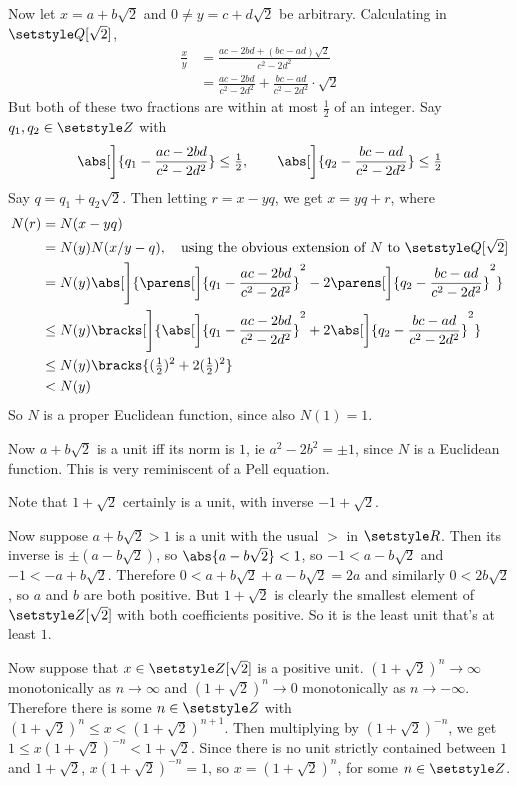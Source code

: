 \documentclass[fleqn,a4paper,11pt]{article}
\begin{document}
Now let \(x = a + b\sqrt 2\) and \(0 \ne y = c + d \sqrt 2\) be arbitrary.
Calculating in \(\Q[\sqrt 2]\),
\begin{align*}
 \frac xy
  &= \frac{ac - 2bd + (bc - ad)\sqrt 2}{c^2 - 2d^2} \\
  &= \frac{ac - 2bd}{c^2 - 2d^2} + \frac{bc - ad}{c^2 - 2d^2} \cdot \sqrt 2
\end{align*}
But both of these two fractions are within at most \(\tfrac 12\) of an integer.
Say \(q_1, q_2 \in \Z\) with
\begin{equation*}
 \abs[\bigg]{q_1 - \frac{ac - 2bd}{c^2 - 2d^2}} \le \tfrac 12, \qquad
 \abs[\bigg]{q_2 - \frac{bc - ad}{c^2 - 2d^2}} \le \tfrac 12
\end{equation*}
Say \(q = q_1 + q_2 \sqrt 2\). Then letting \(r = x - yq\), we get
\(x = yq + r\), where
\begin{align*}
 N(r)
  &= N(x - yq) \\
  &= N(y)N(x/y - q),
    \quad \text{using the obvious extension of \(N\) to \(\Q[\sqrt 2]\)} \\
  &= N(y) \abs[\Bigg]{\parens[\bigg]{q_1 - \frac{ac - 2bd}{c^2 - 2d^2}}^2
            - 2\parens[\bigg]{q_2 - \frac{bc - ad}{c^2 - 2d^2}}^2} \\
  &\le N(y) \bracks[\Bigg]{\abs[\bigg]{q_1 - \frac{ac - 2bd}{c^2 - 2d^2}}^2
            + 2\abs[\bigg]{q_2 - \frac{bc - ad}{c^2 - 2d^2}}^2} \\
  &\le N(y) \bracks{(\tfrac 12)^2 + 2(\tfrac 12)^2} \\
  &< N(y)
\end{align*}
So \(N\) is a proper Euclidean function, since also \(N(1) = 1\).

Now \(a + b\sqrt 2\) is a unit iff its norm is \(1\), ie \(a^2 - 2b^2 = \pm 1\),
since \(N\) is a Euclidean function. This is very reminiscent of a Pell
equation.

Note that \(1 + \sqrt 2\) certainly is a unit, with inverse \(-1 + \sqrt 2\).

Now suppose \(a + b\sqrt 2 > 1\) is a unit with the usual \(>\) in \(\R\).
Then its inverse is \(\pm(a - b\sqrt 2)\), so \(\abs{a - b\sqrt 2} < 1\), so
\(-1 < a - b\sqrt 2\) and \(-1 < -a + b \sqrt 2\). Therefore \(0 < a + b\sqrt 2
+ a - b\sqrt 2 = 2a\) and similarly \(0 < 2b\sqrt 2\), so \(a\) and \(b\) are
both positive. But \(1 + \sqrt 2\) is clearly the smallest element of
\(\Z[\sqrt 2]\) with both coefficients positive. So it is the least unit that's
at least \(1\).

Now suppose that \(x \in \Z[\sqrt 2]\) is a positive unit.
\((1 + \sqrt 2)^n \to \infty\) monotonically as \(n \to \infty\) and
\((1 + \sqrt 2)^n \to 0\) monotonically as \(n \to -\infty\). Therefore there is
some \(n \in \Z\) with \((1 + \sqrt 2)^n \le x < (1 + \sqrt 2)^{n + 1}\). Then
multiplying by \((1 + \sqrt 2)^{-n}\), we get
\(1 \le x(1 + \sqrt 2)^{-n} < 1 + \sqrt 2\). Since there is no unit strictly
contained between \(1\) and \(1 + \sqrt 2\), \(x(1 + \sqrt 2)^{-n} = 1\), so
\(x = (1 + \sqrt 2)^n\), for some \(n \in \Z\).
\end{document}
